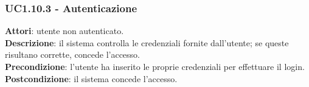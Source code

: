 	\subsubsection{UC1.10.3 - Autenticazione}{
		\label{uc1.10.3}
		\textbf{Attori}: utente non autenticato.	\\
		\textbf{Descrizione}: il sistema controlla le credenziali fornite dall'utente; se queste risultano corrette, concede l'accesso.	\\
		\textbf{Precondizione}: l'utente  ha inserito le proprie credenziali per effettuare il login.	\\
		\textbf{Postcondizione}: il sistema concede l'accesso.	\\
		}